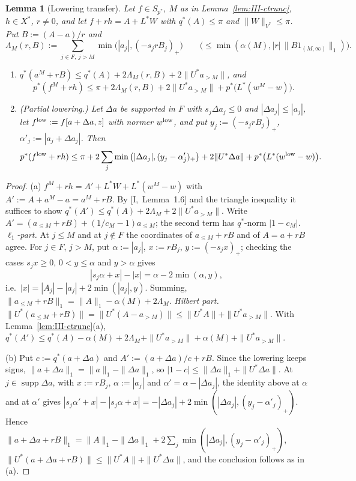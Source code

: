 \documentclass[10pt]{amsart}
\newtheorem{lemma}[theorem]{Lemma}
\theoremstyle{definition}
\theoremstyle{remark}
\newcommand{\supp}{\operatorname{supp}}
\begin{document}
\begin{lemma}[Lowering transfer]\label{lem:III-LT}
Let $f\in S_{p^*}$, $M$ as in Lemma~\textup{\ref{lem:III-ctrunc}}, $h\in X^*$,
$r\ne0$, and let $f+rh=A+L^*W$ with $q^*(A)\le\pi$ and $\|W\|_{V^*}\le\pi$.
Put $B:=(A-a)/r$ and
\[
 \Lambda_M(r,B):=\sum_{j\in F,\ j>M}\min\big(|a_j|,(-s_jrB_j)_+\big)\qquad
 \big(\le\min(\alpha(M),|r|\,\|B1_{(M,\infty)}\|_1)\big).
\]
\begin{enumerate}
\item[(a)] $q^*(a^M+rB)\le q^*(A)+2\Lambda_M(r,B)+2\|U^*a_{>M}\|$, and
\[
 p^*(f^M+rh)\le\pi+2\Lambda_M(r,B)+2\|U^*a_{>M}\|+p^*\big(L^*(w^M-w)\big).
\]
\item[(b)] \textup{(Partial lowering.)}  Let $\Delta a$ be supported in $F$ with
$s_j\Delta a_j\le0$ and $|\Delta a_j|\le|a_j|$, let $f^{\rm low}:=f[a+\Delta a,
z]$ with normer $w^{\rm low}$, and put $y_j:=(-s_jrB_j)_+$,
$\alpha'_j:=|a_j+\Delta a_j|$.  Then
\[
 p^*(f^{\rm low}+rh)\le\pi+2\sum_{j}\min\big(|\Delta a_j|,(y_j-\alpha'_j)_+
 \big)+2\|U^*\Delta a\|+p^*\big(L^*(w^{\rm low}-w)\big).
\]
\end{enumerate}
\end{lemma}

\begin{proof}
(a) $f^M+rh=A'+L^*W+L^*(w^M-w)$ with $A':=A+a^M-a=a^M+rB$.  By
[I,~Lemma~1.6] and the triangle inequality it suffices to show
$q^*(A')\le q^*(A)+2\Lambda_M+2\|U^*a_{>M}\|$.  Write
$A'=(a_{\le M}+rB)+(1/c_M-1)a_{\le M}$; the second term has $q^*$-norm
$|1-c_M|$.  \emph{$\ell_1$-part.}  At $j\le M$ and at $j\notin F$ the
coordinates of $a_{\le M}+rB$ and of $A=a+rB$ agree.  For $j\in F$, $j>M$,
put $\alpha:=|a_j|$, $x:=rB_j$, $y:=(-s_jx)_+$; checking the cases
$s_jx\ge0$, $0<y\le\alpha$ and $y>\alpha$ gives
\[
 |s_j\alpha+x|-|x|=\alpha-2\min(\alpha,y),
\]
i.e.\ $|x|=|A_j|-|a_j|+2\min(|a_j|,y)$.  Summing,
$\|a_{\le M}+rB\|_1=\|A\|_1-\alpha(M)+2\Lambda_M$.  \emph{Hilbert part.}
$\|U^*(a_{\le M}+rB)\|=\|U^*(A-a_{>M})\|\le\|U^*A\|+\|U^*a_{>M}\|$.  With
Lemma~\ref{lem:III-ctrunc}(a),
$q^*(A')\le q^*(A)-\alpha(M)+2\Lambda_M+\|U^*a_{>M}\|+\alpha(M)+
\|U^*a_{>M}\|$.

(b) Put $c:=q^*(a+\Delta a)$ and $A':=(a+\Delta a)/c+rB$.  Since the lowering
keeps signs, $\|a+\Delta a\|_1=\|a\|_1-\|\Delta a\|_1$, so $|1-c|\le\|\Delta
a\|_1+\|U^*\Delta a\|$.  At $j\in\supp\Delta a$, with $x:=rB_j$,
$\alpha:=|a_j|$ and $\alpha'=\alpha-|\Delta a_j|$, the identity above at
$\alpha$ and at $\alpha'$ gives
$|s_j\alpha'+x|-|s_j\alpha+x|=-|\Delta a_j|+2\min(|\Delta a_j|,(y_j-\alpha'_j)_+)$.
Hence $\|a+\Delta a+rB\|_1=\|A\|_1-\|\Delta a\|_1+2\sum_j\min(|\Delta a_j|,
(y_j-\alpha'_j)_+)$, $\|U^*(a+\Delta a+rB)\|\le\|U^*A\|+\|U^*\Delta a\|$, and
the conclusion follows as in (a).
\end{proof}
\end{document}
